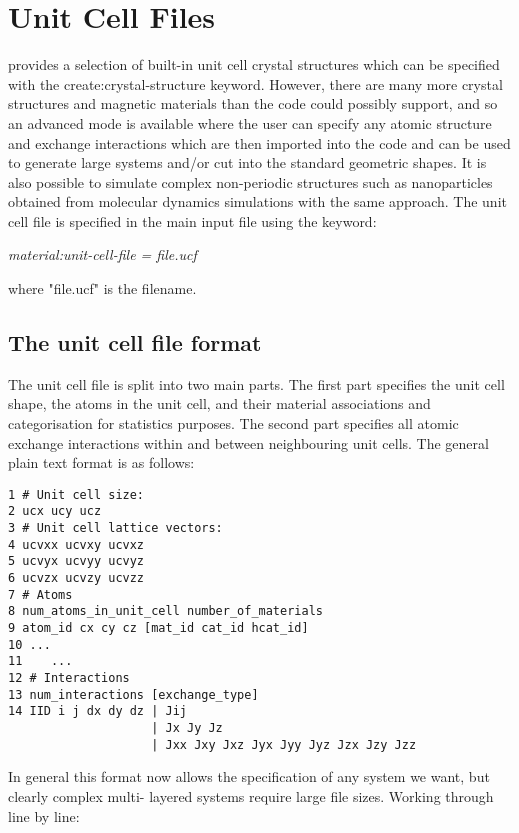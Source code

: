 \chapter{Unit Cell Files}\label{chap:unitcellfiles}
\vampire provides a selection of built-in unit cell crystal structures which can be specified with the 
create:crystal-structure keyword. However, there are many more crystal structures and magnetic materials than the code could possibly support, and so an advanced mode is available where the user can specify any atomic structure and exchange interactions which are then imported into the code and can be used to generate large systems and/or cut into the standard geometric shapes. It is also possible to simulate complex non-periodic structures such as nanoparticles obtained from molecular dynamics simulations with the same approach. The unit cell file is specified in the main input file using the keyword:

\noindent\textit{material:unit-cell-file = file.ucf}

\noindent where "file.ucf" is the filename. 

\section*{The unit cell file format}
The unit cell file is split into two main parts. The first part specifies the unit cell shape, the atoms in the unit cell, and their material associations and categorisation for statistics purposes. The second part specifies all atomic exchange interactions within and between neighbouring unit cells. The general plain text format is as follows:

\begin{verbatim}
1 # Unit cell size:
2 ucx ucy ucz
3 # Unit cell lattice vectors:
4 ucvxx ucvxy ucvxz
5 ucvyx ucvyy ucvyz
6 ucvzx ucvzy ucvzz
7 # Atoms
8 num_atoms_in_unit_cell number_of_materials
9 atom_id cx cy cz [mat_id cat_id hcat_id]
10 ...
11    ...
12 # Interactions
13 num_interactions [exchange_type] 
14 IID i j dx dy dz | Jij
                    | Jx Jy Jz
                    | Jxx Jxy Jxz Jyx Jyy Jyz Jzx Jzy Jzz
\end{verbatim}

In general this format now allows the specification of any system we want, but clearly complex multi- layered systems require large file sizes. Working through line by line:

